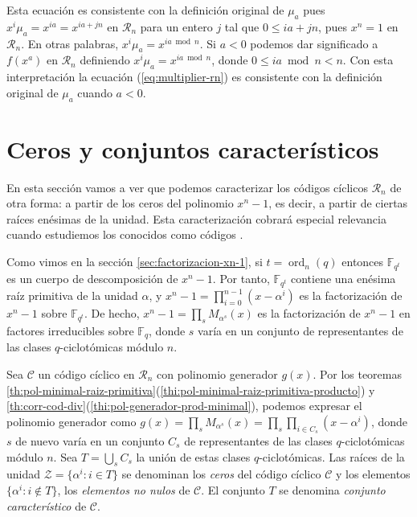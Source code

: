 Esta ecuación es consistente con la definición original de \(\mu_a\) pues \(x^i\mu_a = x^{ia} = x^{ia + jn}\) en \(\mathcal R_n\) para un entero \(j\) tal que \(0 \leq ia + jn\), pues \(x^n = 1\) en \(\mathcal R_n\).
En otras palabras, \(x^i\mu_a = x^{ia \bmod n}\).
Si \(a < 0\) podemos dar significado a \(f(x^a)\) en \(\mathcal R_n\) definiendo \(x^{i}\mu_a = x^{ia \bmod n}\), donde \(0 \leq ia \bmod n < n\).
Con esta interpretación la ecuación (\ref{eq:multiplier-rn}) es consistente con la definición original de \(\mu_a\) cuando \(a < 0\).


\section{Ceros y conjuntos característicos}

En esta sección vamos a ver que podemos caracterizar los códigos cíclicos \(\mathcal R_n\) de otra forma: a partir de los ceros del polinomio \(x^n - 1\), es decir, a partir de ciertas raíces enésimas de la unidad.
Esta caracterización cobrará especial relevancia cuando estudiemos los conocidos como códigos .

Como vimos en la sección \ref{sec:factorizacion-xn-1}, si \(t = \operatorname{ord}_n(q)\) entonces \(\mathbb F_{q^t}\) es un cuerpo de descomposición de \(x^n - 1\).
Por tanto, \(\mathbb F_{q^t}\) contiene una enésima raíz primitiva de la unidad \(\alpha\), y \(x^n - 1 = \prod_{i=0}^{n-1}(x - \alpha^{i})\) es la factorización de \(x^n - 1\) sobre \(\mathbb F_{q^t}\).
De hecho, \(x^n - 1 = \prod_s M_{\alpha^s}(x)\) es la factorización de \(x^n - 1\) en factores irreducibles sobre \(\mathbb F_q\), donde \(s\) varía en un conjunto de representantes de las clases \(q\)-ciclotómicas módulo \(n\).

Sea \(\mathcal C\) un código cíclico en \(\mathcal R_n\) con polinomio generador \(g(x)\).
Por los teoremas \ref{th:pol-minimal-raiz-primitiva}(\ref{thi:pol-minimal-raiz-primitiva-producto}) y \ref{th:corr-cod-div}(\ref{thi:pol-generador-prod-minimal}), podemos expresar el polinomio generador como \(g(x) = \prod_{s}M_{\alpha^s}(x) = \prod_s\prod_{i \in C_s}(x - \alpha^{i})\), donde \(s\) de nuevo varía en un conjunto \(C_s\) de representantes de las clases \(q\)-ciclotómicas módulo \(n\).
Sea \(T = \bigcup_s C_s\) la unión de estas clases \(q\)-ciclotómicas.
Las raíces de la unidad \(\mathcal Z = \{\alpha^{i} : i \in T\}\) se denominan los \textit{ceros} del código cíclico \(\mathcal C\) y los elementos \(\{\alpha^{i} : i \notin T\}\), los \textit{elementos no nulos} de \(\mathcal C\).
El conjunto \(T\) se denomina \textit{conjunto característico} de \(\mathcal C\).

